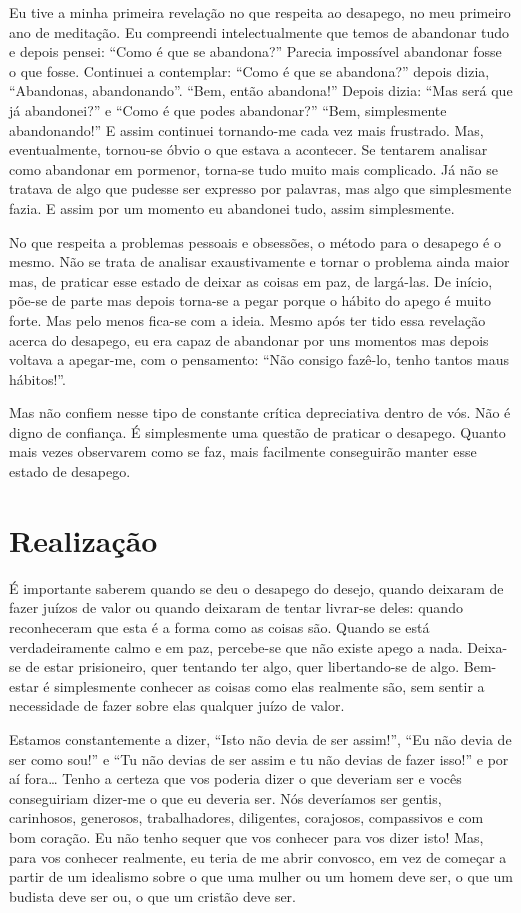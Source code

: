 Eu tive a minha primeira revelação no que respeita ao desapego, no meu primeiro
ano de meditação. Eu compreendi intelectualmente que temos de abandonar tudo e
depois pensei: “Como é que se abandona?” Parecia impossível abandonar fosse o
que fosse. Continuei a contemplar: “Como é que se abandona?” depois dizia,
“Abandonas, abandonando”. “Bem, então abandona!” Depois dizia: “Mas será que já
abandonei?” e “Como é que podes abandonar?” “Bem, simplesmente abandonando!” E
assim continuei tornando-me cada vez mais frustrado. Mas, eventualmente,
tornou-se óbvio o que estava a acontecer. Se tentarem analisar como abandonar em
pormenor, torna-se tudo muito mais complicado. Já não se tratava de algo que
pudesse ser expresso por palavras, mas algo que simplesmente fazia. E assim por
um momento eu abandonei tudo, assim simplesmente.

No que respeita a problemas pessoais e obsessões, o método para o desapego é o
mesmo. Não se trata de analisar exaustivamente e tornar o problema ainda maior
mas, de praticar esse estado de deixar as coisas em paz, de largá-las. De
início, põe-se de parte mas depois torna-se a pegar porque o hábito do apego é
muito forte. Mas pelo menos fica-se com a ideia. Mesmo após ter tido essa
revelação acerca do desapego, eu era capaz de abandonar por uns momentos mas
depois voltava a apegar-me, com o pensamento: “Não consigo fazê-lo, tenho tantos
maus hábitos!”.

Mas não confiem nesse tipo de constante crítica depreciativa dentro de vós. Não
é digno de confiança. É simplesmente uma questão de praticar o desapego. Quanto
mais vezes observarem como se faz, mais facilmente conseguirão manter esse
estado de desapego.

\section{Realização}

É importante saberem quando se deu o desapego do desejo, quando deixaram de
fazer juízos de valor ou quando deixaram de tentar livrar-se deles: quando
reconheceram que esta é a forma como as coisas são. Quando se está
verdadeiramente calmo e em paz, percebe-se que não existe apego a nada. Deixa-se
de estar prisioneiro, quer tentando ter algo, quer libertando-se de algo.
Bem-estar é simplesmente conhecer as coisas como elas realmente são, sem sentir
a necessidade de fazer sobre elas qualquer juízo de valor.

Estamos constantemente a dizer, “Isto não devia de ser assim!”, “Eu não devia de
ser como sou!” e “Tu não devias de ser assim e tu não devias de fazer isso!” e
por aí fora\ldots{} Tenho a certeza que vos poderia dizer o que deveriam ser e
vocês conseguiriam dizer-me o que eu deveria ser. Nós deveríamos ser gentis,
carinhosos, generosos, trabalhadores, diligentes, corajosos, compassivos e com
bom coração. Eu não tenho sequer que vos conhecer para vos dizer isto! Mas, para
vos conhecer realmente, eu teria de me abrir convosco, em vez de começar a
partir de um idealismo sobre o que uma mulher ou um homem deve ser, o que um
budista deve ser ou, o que um cristão deve ser.

